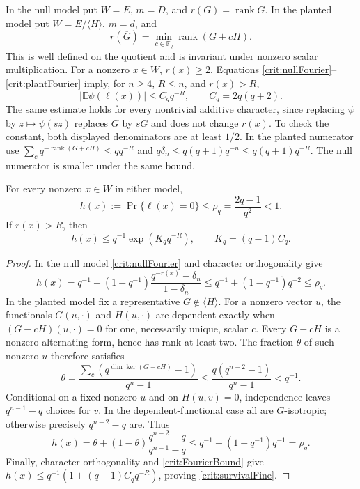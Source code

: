 In the null model put $W=E$, $m=D$, and $r(G)=\operatorname{rank}G$.
In the planted model put $W=E/\langle H\rangle$, $m=d$, and
\[
 r(\overline G)=\min_{c\in\mathbb F_q}\operatorname{rank}(G+cH).
\]
This is well defined on the quotient and is invariant under nonzero
scalar multiplication. For a nonzero $x\in W$, $r(x)\ge2$.
Equations \eqref{crit:nullFourier}--\eqref{crit:plantFourier} imply, for
$n\ge4$, $R\le n$, and $r(x)>R$,
\begin{equation}\label{crit:FourierBound}
 |\mathbb E\psi(\ell(x))|\le C_q q^{-R},\qquad
 C_q=2q(q+2).
\end{equation}
The same estimate holds for every nontrivial additive character, since
replacing $\psi$ by $z\mapsto\psi(sz)$ replaces $G$ by $sG$ and does
not change $r(x)$. To check the constant, both displayed denominators
are at least $1/2$. In the planted numerator use
$\sum_cq^{-\operatorname{rank}(G+cH)}\le q q^{-R}$ and
$q\delta_n\le q(q+1)q^{-n}\le q(q+1)q^{-R}$. The null numerator is
smaller under the same bound.

\begin{lemma}\label{crit:rho}
For every nonzero $x\in W$ in either model,
\[
 h(x):=\Pr\{\ell(x)=0\}\le\rho_q=\frac{2q-1}{q^2}<1.
\]
If $r(x)>R$, then
\begin{equation}\label{crit:survivalFine}
 h(x)\le q^{-1}\exp(K_q q^{-R}),\qquad
 K_q=(q-1)C_q.
\end{equation}
\end{lemma}

\begin{proof}
In the null model \eqref{crit:nullFourier} and character orthogonality
give
\[
 h(x)=q^{-1}+(1-q^{-1})
 \frac{q^{-r(x)}-\delta_n}{1-\delta_n}
 \le q^{-1}+(1-q^{-1})q^{-2}\le\rho_q.
\]
In the planted model fix a representative $G\notin\langle H\rangle$.
For a nonzero vector $u$, the functionals $G(u,\cdot)$ and
$H(u,\cdot)$ are dependent exactly when
$(G-cH)(u,\cdot)=0$ for one, necessarily unique, scalar $c$.
Every $G-cH$ is a nonzero alternating form, hence has rank at least two.
The fraction $\theta$ of such nonzero $u$ therefore satisfies
\[
 \theta=\frac{\sum_c(q^{\dim\ker(G-cH)}-1)}{q^n-1}
 \le\frac{q(q^{n-2}-1)}{q^n-1}<q^{-1}.
\]
Conditional on a fixed nonzero $u$ and on $H(u,v)=0$, independence
leaves $q^{n-1}-q$ choices for $v$. In the dependent-functional case
all are $G$-isotropic; otherwise precisely $q^{n-2}-q$ are.
Thus
\[
 h(x)=\theta+(1-\theta)\frac{q^{n-2}-q}{q^{n-1}-q}
 \le q^{-1}+(1-q^{-1})q^{-1}=\rho_q.
\]
Finally, character orthogonality and \eqref{crit:FourierBound} give
$h(x)\le q^{-1}(1+(q-1)C_q q^{-R})$, proving
\eqref{crit:survivalFine}.
\end{proof}

